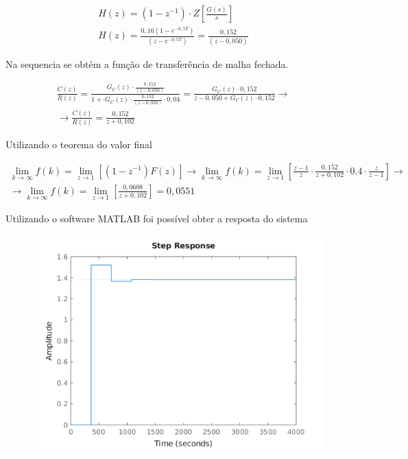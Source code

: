 \documentclass[a4paper,12pt]{article}
\begin{document}
			\begin{equation}
			\left.
			\begin{array}{c}
				\displaystyle H(z) = (1 - z^{-1}) \cdot Z\left[\frac{G(s)}{s}\right] \\[20pt]
				
				\displaystyle H(z)  = \frac{0,16(1 - e^{-0,5T})}{(z-e^{-0,5T})} = \frac{0,152}{(z-0,050)}
			\end{array}
			\right.
			\quad 
		\end{equation}
		
		Na sequencia se obtém a função de transferência de malha fechada.
		
			
		\begin{equation}
			\left.
			\begin{array}{c}
				\displaystyle \frac{C(z)}{R(z)} = \frac{G_C(z) \cdot \displaystyle \frac{0,152}{(z-0,050)}}{1 + \cdot G_C(z) \cdot \displaystyle \frac{0,152}{(z-0,050)} \cdot 0,04} = \frac{G_C(z) \cdot 0,152}{z - 0,050 + G_C(z) \cdot 0,152} \rightarrow \\[30pt]
				
				\displaystyle \rightarrow \frac{C(z)}{R(z)} = \frac{0,152}{z + 0,102}
			\end{array}
			\right.
			\quad 
			\label{eq:ftma}
		\end{equation}

		Utilizando o teorema do valor final
		
		\begin{equation}
			\left.
			\begin{array}{c}
				\displaystyle \lim_{k \to \infty}f(k) = \lim_{z \to 1}\left[(1-z^{-1})F(z) \right] \rightarrow \lim_{k \to \infty}f(k) = \lim_{z \to 1}\left[ \frac{z-1}{z} \cdot \frac{0,152}{z + 0,102} \cdot 0.4 \cdot \frac{z}{z-1}  \right] \rightarrow \\[20pt]
				
				\displaystyle \rightarrow \lim_{k \to \infty}f(k) =  \lim_{z \to 1}\left[  \frac{0,0608}{z + 0,102}  \right] = 0,0551
			\end{array}
			\right.
			\quad 
		\end{equation}	
		
		Utilizando o software MATLAB foi possível obter a resposta do sistema
		
		\begin{figure}[H]
			\centering
			\includegraphics[width=0.5\linewidth]{images/resp2g.png}
			\label{fig:resposta_g}
		\end{figure}
\end{document}
